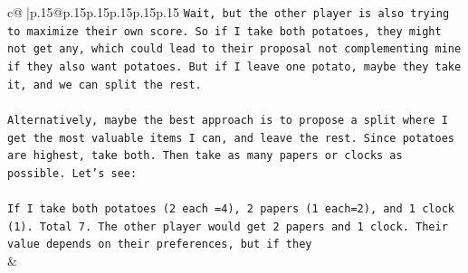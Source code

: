 \documentclass{article}
\begin{document}
{\begin{supertabular}{c@{$\;$}|p{.15\linewidth}@{}p{.15\linewidth}p{.15\linewidth}p{.15\linewidth}p{.15\linewidth}p{.15\linewidth}}
{{{\texttt{Wait, but the other player is also trying to maximize their own score. So if I take both potatoes, they might not get any, which could lead to their proposal not complementing mine if they also want potatoes. But if I leave one potato, maybe they take it, and we can split the rest.} \\
\\ 
\texttt{Alternatively, maybe the best approach is to propose a split where I get the most valuable items I can, and leave the rest. Since potatoes are highest, take both. Then take as many papers or clocks as possible. Let's see:} \\
\\ 
\texttt{If I take both potatoes (2 each =4), 2 papers (1 each=2), and 1 clock (1). Total 7. The other player would get 2 papers and 1 clock. Their value depends on their preferences, but if they} \\
            }
        }
    }
    & \\ \\


\end{supertabular}}
\end{document}
